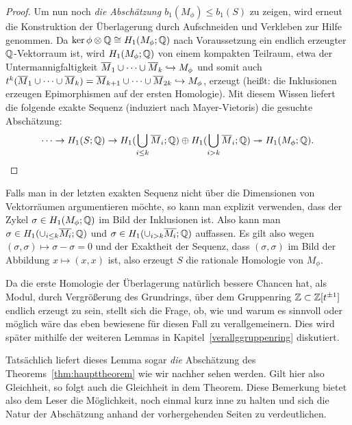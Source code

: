 \begin{proof}
	  Um nun noch\emph{ die Abschätzung $b_1(M_\phi) \leq b_1(S)$ }zu zeigen, wird erneut die Konstruktion der Überlagerung durch Aufschneiden und Verkleben zur Hilfe genommen. Da $\ker\phi \otimes \mathbb{Q} \cong H_1(M_\phi;\mathbb{Q})$ nach Voraussetzung ein endlich erzeugter $\mathbb{Q}$-Vektorraum ist, wird $H_1(M_\phi;\mathbb{Q})$ von einem kompakten Teilraum, etwa der Untermannigfaltigkeit $\overline M_1 \cup \cdots \cup \overline M_k \hookrightarrow M_\phi$ und somit auch $t^k(\overline M_1 \cup \cdots \cup \overline M_k )  = \overline M_{k+1} \cup \cdots \cup \overline M_{2k}\hookrightarrow M_\phi$, erzeugt (heißt: die Inklusionen erzeugen Epimorphismen auf der ersten Homologie). Mit diesem Wissen liefert die folgende exakte Sequenz (induziert nach Mayer-Vietoris) die gesuchte Abschätzung:
	  \[
	  	\cdots \to H_1(S;\mathbb{Q}) \to H_1(\bigcup_{i\leq k}\overline M_i;\mathbb{Q}) \oplus H_1(\bigcup_{i>k} \overline M_i;\mathbb{Q}) \twoheadrightarrow H_1(M_\phi;\mathbb{Q}).
	  \]
\end{proof}
\begin{bem}
	Falls man in der letzten exakten Sequenz nicht über die Dimensionen von Vektorräumen argumentieren möchte, so kann man explizit verwenden, dass der Zykel $\sigma \in H_1(M_\phi;\mathbb{Q})$ im Bild der Inklusionen ist. Also kann man $\sigma \in H_1(\cup_{i\leq k} \overline{M_i};\mathbb{Q})$ und $\sigma \in H_1(\cup_{i > k} \overline{M_i};\mathbb{Q})$ auffassen. Es gilt also wegen $(\sigma,\sigma) \mapsto \sigma-\sigma=0$  und der Exaktheit der Sequenz, dass $(\sigma,\sigma)$ im Bild der Abbildung $x \mapsto (x,x)$ ist, also erzeugt $S$ die rationale Homologie von $M_\phi$.
\end{bem}
\begin{bem}
Da die erste Homologie der Überlagerung natürlich bessere Chancen hat, als Modul, durch Vergrößerung des Grundrings, über dem Gruppenring $\mathbb{Z}\subset \mathbb{Z}[t^{\pm 1}]$ endlich erzeugt zu sein, stellt sich die Frage, ob, wie und warum es sinnvoll oder möglich wäre das eben bewiesene für diesen Fall zu verallgemeinern. Dies wird später mithilfe der weiteren Lemmas in Kapitel~\ref{verallggruppenring} diskutiert. 
\end{bem}
\begin{bem}
	Tatsächlich liefert dieses Lemma sogar \emph{die} Abschätzung des Theorems~\ref{thm:haupttheorem} wie wir nachher sehen werden. Gilt hier also Gleichheit, so folgt auch die Gleichheit in dem Theorem. Diese Bemerkung bietet also dem Leser die Möglichkeit, noch einmal kurz inne zu halten und sich die Natur der Abschätzung anhand der vorhergehenden Seiten zu verdeutlichen.
\end{bem}

